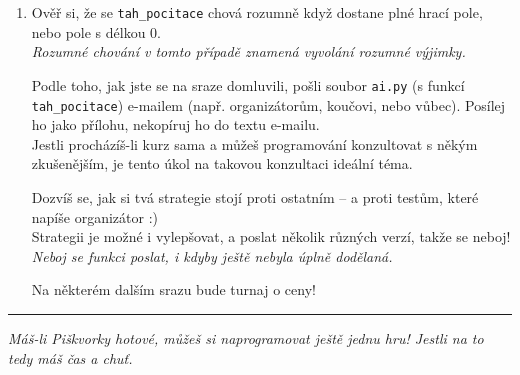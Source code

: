 \documentclass[a4paper,10pt]{article}
\newcommand\startsection[1]{
     \vspace{0.2ex}
    \hrule
    {\fontspec{Oxygen} \tiny
     \vspace{-1ex}
     \emph{#1}
     \vspace{-1.5em}
    }
}
\begin{document}
\begin{enumerate}
\item Ověř si, že se \texttt{tah\_pocitace} chová rozumně když dostane plné hrací pole, nebo pole s délkou 0.
    \\\emph{\small Rozumné chování v tomto případě znamená vyvolání rozumné výjimky.}

    Podle toho, jak jste se na sraze domluvili, pošli
    soubor \texttt{ai.py} (s funkcí \texttt{tah\_pocitace})
    e-mailem (např. organizátorům, koučovi, nebo vůbec).
    Posílej ho jako přílohu, nekopíruj ho do textu e-mailu.
    \\Jestli procházíš-li kurz sama a můžeš programování konzultovat s někým
    zkušenějším, je tento úkol na takovou konzultaci ideální téma.

    Dozvíš se, jak si tvá strategie stojí proti ostatním – a proti testům, které napíše organizátor :)
    \\Strategii je možné i vylepšovat, a poslat několik různých verzí, takže se neboj!
    \\\emph{\small Neboj se funkci poslat, i kdyby ještě nebyla úplně dodělaná.}

    Na některém dalším srazu bude turnaj o ceny!

\end{enumerate}

\newpage

\startsection{Máš-li Piškvorky hotové, můžeš si naprogramovat ještě jednu hru! Jestli na to tedy máš čas a chuť.}
\end{document}

